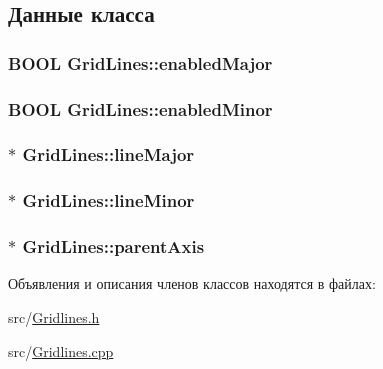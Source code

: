 \subsection{Данные класса}
\hypertarget{class_grid_lines_ad32092e3573f3fd24c3b1190f35034aa}{
\subsubsection[{enabled\-Major}]{\setlength{\rightskip}{0pt plus 5cm}B\-O\-O\-L Grid\-Lines\-::enabled\-Major\hspace{0.3cm}{\ttfamily [protected]}}}\label{class_grid_lines_ad32092e3573f3fd24c3b1190f35034aa}
\hypertarget{class_grid_lines_ae7f5d84d6a6b353e22fd251a20ac33f5}{
\subsubsection[{enabled\-Minor}]{\setlength{\rightskip}{0pt plus 5cm}B\-O\-O\-L Grid\-Lines\-::enabled\-Minor\hspace{0.3cm}{\ttfamily [protected]}}}\label{class_grid_lines_ae7f5d84d6a6b353e22fd251a20ac33f5}
\hypertarget{class_grid_lines_a3e368e27515f01143f5470b65c9f2a52}{
\subsubsection[{line\-Major}]{$\ast$ Grid\-Lines\-::line\-Major\hspace{0.3cm}{\ttfamily [protected]}}}\label{class_grid_lines_a3e368e27515f01143f5470b65c9f2a52}
\hypertarget{class_grid_lines_a72d2d255547ee192ff15609a254994fe}{
\subsubsection[{line\-Minor}]{$\ast$ Grid\-Lines\-::line\-Minor\hspace{0.3cm}{\ttfamily [protected]}}}\label{class_grid_lines_a72d2d255547ee192ff15609a254994fe}
\hypertarget{class_grid_lines_a1e3ebb07403f525c882731bb1662b234}{
\subsubsection[{parent\-Axis}]{$\ast$ Grid\-Lines\-::parent\-Axis\hspace{0.3cm}{\ttfamily [protected]}}}\label{class_grid_lines_a1e3ebb07403f525c882731bb1662b234}


Объявления и описания членов классов находятся в файлах\-:\begin{DoxyCompactItemize}
\item 
src/\hyperlink{_gridlines_8h}{Gridlines.\-h}\item 
src/\hyperlink{_gridlines_8cpp}{Gridlines.\-cpp}\end{DoxyCompactItemize}
